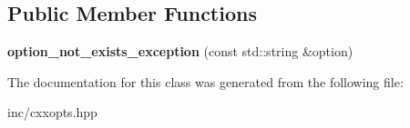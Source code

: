 \subsection*{Public Member Functions}
\begin{DoxyCompactItemize}
\item 
{\bfseries option\+\_\+not\+\_\+exists\+\_\+exception} (const std\+::string \&option)\hypertarget{classcxxopts_1_1option__not__exists__exception_a3a48a64b139a9fd7f27bffe350cf6b76}{}\label{classcxxopts_1_1option__not__exists__exception_a3a48a64b139a9fd7f27bffe350cf6b76}

\end{DoxyCompactItemize}


The documentation for this class was generated from the following file\+:\begin{DoxyCompactItemize}
\item 
inc/cxxopts.\+hpp\end{DoxyCompactItemize}
